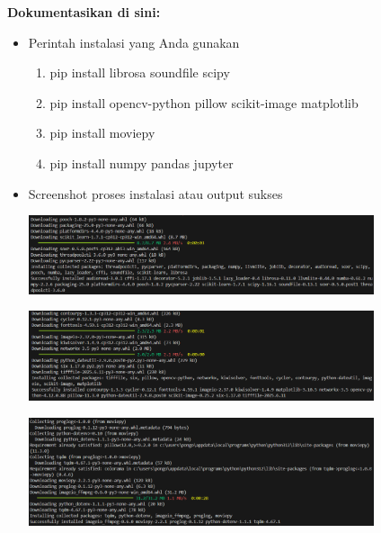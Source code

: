 \documentclass[11pt,a4paper]{article}
\begin{document}
\textbf{Dokumentasikan di sini:}
\begin{itemize}
    \item Perintah instalasi yang Anda gunakan
    \begin{enumerate}
        \item pip install librosa soundfile scipy
        \item pip install opencv-python pillow scikit-image matplotlib
        \item pip install moviepy
        \item pip install numpy pandas jupyter
    \end{enumerate}

    \item Screenshot proses instalasi atau output sukses
    
    \begin{minipage}{\linewidth}
        \centering
        \includegraphics[width=0.8\textwidth]{Figure/output sukses librosa.png}
        \label{fig:output_librosa}
    \end{minipage}
        
    \begin{minipage}{\linewidth}
        \centering
        \includegraphics[width=0.8\textwidth]{Figure/output sukses opencv.png}
        \label{fig:output_opencv}
    \end{minipage}
        
    \begin{minipage}{\linewidth}
        \centering
        \includegraphics[width=0.8\textwidth]{Figure/output sukses moviepy.png}
        \label{fig:output_moviepy}
    \end{minipage}
        

\end{itemize}
\end{document}
